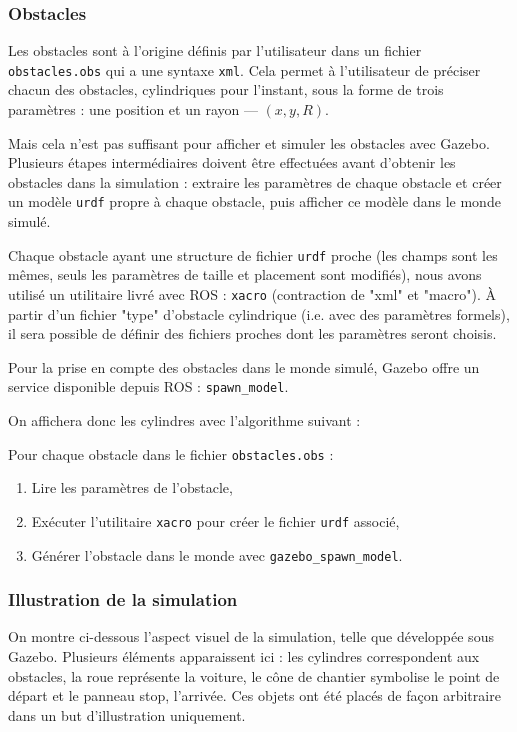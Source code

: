 \documentclass[a4paper,12pt]{report}
\begin{document}
\subsubsection{Obstacles}
Les obstacles sont à l'origine définis par l'utilisateur dans un fichier \texttt{obstacles.obs}  qui a une syntaxe \texttt{xml}. Cela permet à l'utilisateur de préciser chacun des obstacles, cylindriques pour l'instant, sous la forme de trois paramètres : une position et un rayon --- $(x, y, R)$.

Mais cela n'est pas suffisant pour afficher et simuler les obstacles avec Gazebo. Plusieurs étapes intermédiaires doivent être effectuées avant d'obtenir les obstacles dans la simulation : extraire les paramètres de chaque obstacle et créer un modèle \texttt{urdf} propre à chaque obstacle, puis afficher ce modèle dans le monde simulé.

Chaque obstacle ayant une structure de fichier \texttt{urdf} proche (les champs sont les mêmes, seuls les paramètres de taille et placement sont modifiés), nous avons utilisé un utilitaire livré avec ROS : \texttt{xacro} (contraction de "xml" et "macro"). À partir d'un fichier "type" d'obstacle cylindrique (i.e. avec des paramètres formels), il sera possible de définir des fichiers proches dont les paramètres seront choisis.

Pour la prise en compte des obstacles dans le monde simulé, Gazebo offre un service disponible depuis ROS : \texttt{spawn\_model}.

On affichera donc les cylindres avec l'algorithme suivant :

\begin{framed}
Pour chaque obstacle dans le fichier \texttt{obstacles.obs} :
\begin{enumerate}
\itemsep0em
\item Lire les paramètres de l'obstacle, 
\item Exécuter l'utilitaire \texttt{xacro} pour créer le fichier \texttt{urdf} associé, 
\item Générer l'obstacle dans le monde avec \texttt{gazebo\_spawn\_model}.
\end{enumerate}
\end{framed}



\subsubsection{Illustration de la simulation}
On montre ci-dessous l'aspect visuel de la simulation, telle que développée sous Gazebo. Plusieurs éléments apparaissent ici : les cylindres correspondent aux obstacles, la roue représente la voiture, le cône de chantier symbolise le point de départ et le panneau stop, l'arrivée. Ces objets ont été placés de façon arbitraire dans un but d'illustration uniquement.
\end{document}
